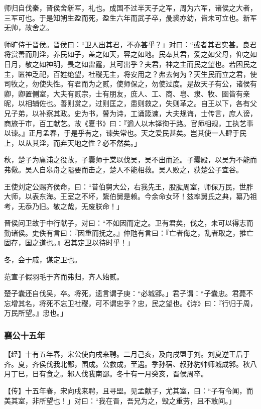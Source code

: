 \documentclass[]{article}
\begin{document}
师归自伐秦，晋侯舍新军，礼也。成国不过半天子之军，周为六军，诸侯之大者，三军可也。于是知朔生盈而死，盈生六年而武子卒，彘裘亦幼，皆未可立也。新军无帅，故舍之。

师旷侍于晋侯。晋侯曰：``卫人出其君，不亦甚乎？」对曰：``或者其君实甚。良君将赏善而刑淫，养民如子，盖之如天，容之如地。民奉其君，爱之如父母，仰之如日月，敬之如神明，畏之如雷霆，其可出乎？夫君，神之主而民之望也。若困民之主，匮神乏祀，百姓绝望，社稷无主，将安用之？弗去何为？天生民而立之君，使司牧之，勿使失性。有君而为之贰，使师保之，勿使过度。是故天子有公，诸侯有卿，卿置侧室，大夫有贰宗，士有朋友，庶人、工、商、皂、隶、牧、圉皆有亲昵，以相辅佐也。善则赏之，过则匡之，患则救之，失则革之。自王以下，各有父兄子弟，以补察其政。史为书，瞽为诗，工诵箴谏，大夫规诲，士传言，庶人谤，商旅于市，百工献艺。故《夏书》曰：『遒人以木铎徇于路。官师相规，工执艺事以谏。』正月孟春，于是乎有之，谏失常也。天之爱民甚矣。岂其使一人肆于民上，以从其淫，而弃天地之性？必不然矣。」

秋，楚子为庸浦之役故，子囊师于棠以伐吴，吴不出而还。子囊殿，以吴为不能而弗儆。吴人自皋舟之隘要而击之，楚人不能相救。吴人败之，获楚公子宜谷。

王使刘定公赐齐侯命，曰：``昔伯舅大公，右我先王，股肱周室，师保万民，世胙大师，以表东海。王室之不坏，繄伯舅是赖。今余命女环！兹率舅氏之典，纂乃祖考，无忝乃旧。敬之哉，无废朕命！」

晋侯问卫故于中行献子，对曰：``不如因而定之。卫有君矣，伐之，未可以得志而勤诸侯。史佚有言曰：『因重而抚之。』仲虺有言曰：『亡者侮之，乱者取之，推亡固存，国之道也。』君其定卫以待时乎！」

冬，会于戚，谋定卫也。

范宣子假羽毛于齐而弗归，齐人始贰。

楚子囊还自伐吴，卒。将死，遗言谓子庚：``必城郢。」君子谓：``子囊忠。君薨不忘增其名，将死不忘卫社稷，可不谓忠乎？忠，民之望也。《诗》曰：『行归于周，万民所望。』忠也。」

\hypertarget{header-n2015}{%
\subsubsection{襄公十五年}\label{header-n2015}}

【经】十有五年春，宋公使向戌来聘。二月己亥，及向戌盟于刘。刘夏逆王后于齐。夏，齐侯伐我北鄙，围成。公救成，至遇。季孙宿、叔孙豹帅师城成郛。秋八月丁巳，日有食之。邾人伐我南鄙。冬十有一月癸亥，晋侯周卒。

【传】十五年春，宋向戌来聘，且寻盟。见孟献子，尤其室，曰：``子有令闻，而美其室，非所望也！」对曰：``我在晋，吾兄为之，毁之重劳，且不敢间。」
\end{document}
